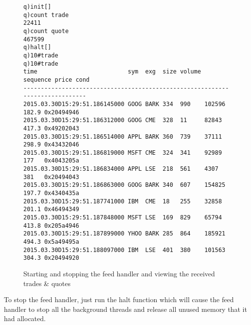 \begin{figure}
\begin{lstlisting}
q)init[]
q)count trade
22411
q)count quote
467599
q)halt[]
q)10#trade
q)10#trade
time                          sym  exg  size volume sequence price cond                  
-----------------------------------------------------------------------------
2015.03.30D15:29:51.186145000 GOOG BARK 334  990    102596   182.9 0x20494946
2015.03.30D15:29:51.186312000 GOOG CME  328  11     82843    417.3 0x49202043
2015.03.30D15:29:51.186514000 APPL BARK 360  739    37111    298.9 0x43432046
2015.03.30D15:29:51.186819000 MSFT CME  324  341    92989    177   0x4043205a
2015.03.30D15:29:51.186834000 APPL LSE  218  561    4307     381   0x20494043
2015.03.30D15:29:51.186863000 GOOG BARK 340  607    154825   197.7 0x4340435a
2015.03.30D15:29:51.187741000 IBM  CME  18   255    32858    201.1 0x46494349
2015.03.30D15:29:51.187848000 MSFT LSE  169  829    65794    413.8 0x205a4946
2015.03.30D15:29:51.187899000 YHOO BARK 285  864    185921   494.3 0x5a49495a
2015.03.30D15:29:51.188097000 IBM  LSE  401  380    101563   304.3 0x20494920
\end{lstlisting}
\caption{Starting and stopping the feed handler and viewing the received trades \& quotes}
\end{figure}

To stop the feed handler, just run the halt function which will cause the feed handler to stop all the background threads
and release all unused memory that it had allocated.